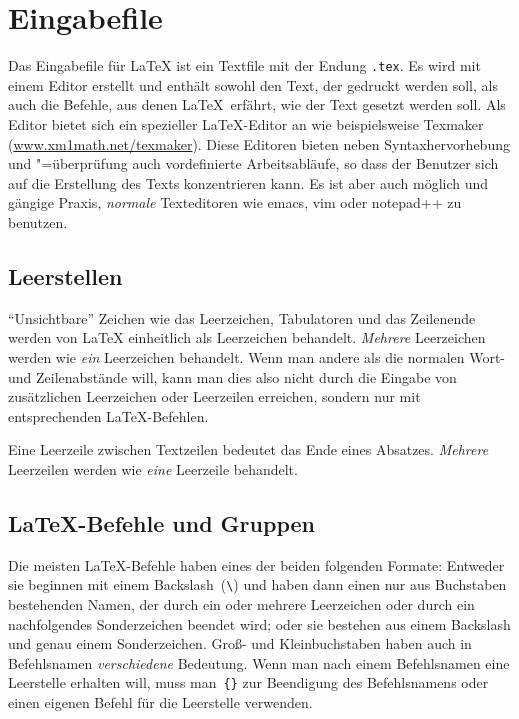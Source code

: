

\section{Eingabefile}

Das Eingabefile für \LaTeX{} ist ein Textfile mit der Endung \lstinline+.tex+.
Es  wird mit einem Editor erstellt und enthält sowohl den Text, der gedruckt
werden  soll, als auch die Befehle, aus denen \LaTeX\ erfährt, wie der Text
gesetzt  werden soll. Als Editor bietet sich ein spezieller \LaTeX-Editor an
wie beispielsweise Texmaker (\href{http://www.xm1math.net/texmaker}{www.xm1math.net/texmaker}). Diese Editoren bieten neben Syntaxhervorhebung
und "=überprüfung auch vordefinierte Arbeitsabläufe, so dass der Benutzer sich
auf die Erstellung des Texts konzentrieren kann. Es ist aber auch möglich und
gängige Praxis, \emph{normale} Texteditoren wie emacs, vim oder notepad++ zu
benutzen.


\subsection{Leerstellen}

"`Unsichtbare"' Zeichen wie das Leerzeichen, Tabulatoren und das Zeilenende
werden von \LaTeX{} einheitlich als Leerzeichen behandelt. \emph{Mehrere}
Leerzeichen werden wie \emph{ein} Leerzeichen behandelt. Wenn man andere als
die normalen Wort- und Zeilenabstände will, kann man dies also nicht durch die
Eingabe von zusätzlichen Leerzeichen oder Leerzeilen erreichen, sondern nur mit
entsprechenden \LaTeX-Befehlen.

Eine Leerzeile zwischen Textzeilen bedeutet das Ende eines Absatzes.
\emph{Mehrere} Leerzeilen werden wie \emph{eine} Leerzeile behandelt.


\subsection{\LaTeX-Befehle und Gruppen}

Die meisten \LaTeX-Befehle haben eines der beiden folgenden Formate: Entweder
sie beginnen mit einem Backslash~(\lstinline|\|) und haben dann einen nur aus
Buchstaben bestehenden Namen, der durch ein oder mehrere Leerzeichen oder
durch ein nachfolgendes Sonderzeichen beendet wird; oder sie bestehen aus
einem Backslash und genau einem Sonderzeichen. Groß- und Kleinbuchstaben haben
auch in Befehlsnamen \emph{verschiedene}  Bedeutung. Wenn man nach einem
Befehlsnamen eine Leerstelle erhalten will, muss  man~\lstinline|{}| zur
Beendigung des Befehlsnamens oder einen eigenen Befehl für die Leerstelle
verwenden.

